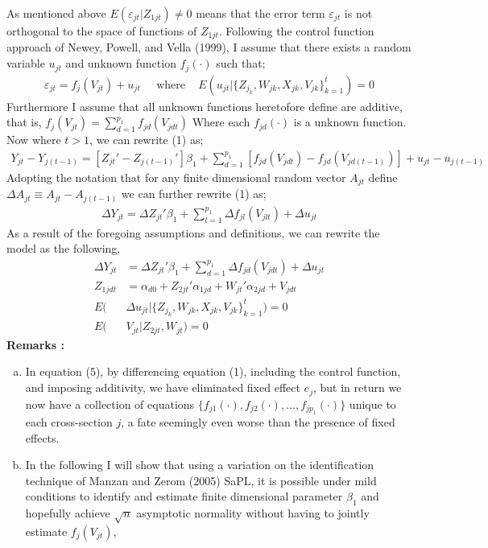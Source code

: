 \documentclass[10pt]{article}
\begin{document}
 \noindent
As mentioned above $E(\varepsilon_{jt} | Z_{1jt} ) \neq 0$ means that the error term $\varepsilon_{jt}$ is not orthogonal to the space of functions of $Z_{1jt}$. Following the control function approach of Newey, Powell, and Vella (1999), I assume that there exists a random variable $u_{jt}$ and unknown function $f_j(\cdot)$ such that;
 \begin{align*}
 \varepsilon_{jt} = f_j(V_{jt}) + u_{jt}  \;\;\;\ \text{ where } \;\;\; E(u_{jt} | \{Z_{j_k},W_{jk},X_{jk},V_{jk} \}_{k=1}^t) = 0
 \end{align*}
 Furthermore I assume that all unknown functions heretofore define are additive, that is, $f_j(V_{jt}) = \sum_{d=1}^{p_1} f_{jd}(V_{jdt})$
%
Where each $f_{jd}(\cdot)$ is a unknown function.
Now where $t>1$, we can rewrite (1) as;
\begin{align*}
Y_{jt} - Y_{j(t-1)} = [ Z_{jt}' - Z_{j(t-1)}' ]\beta_1 +  \sum_{d=1}^{p_1} [ f_{jd}(V_{jdt}) - f_{jd}(V_{jd(t-1)})] + u_{jt} - u_{j(t-1)}
\end{align*}
Adopting the notation that for any finite dimensional random vector $A_{jt}$ define $\Delta A_{jt}  \equiv A_{jt} - A_{j(t-1)}$ we can further rewrite (1) as;
\begin{align*}
\Delta Y_{jt} = \Delta Z_{jt}'\beta_1  + \sum_{l=1}^{p_1} \Delta f_{jl}(V_{jlt}) + \Delta u_{jt}
\end{align*}
As a result of the foregoing assumptions and definitions, we can rewrite the model as the following,
\begin{align}
\Delta Y_{jt} &= \Delta Z_{jt}'\beta_1 + \sum_{d=1}^{p_1} \Delta f_{jd}(V_{jdt}) + \Delta u_{jt} \\
%
Z_{1jdt} &= \alpha_{d0} + Z_{2jt}' \alpha_{1jd} + W_{jt}' \alpha_{2jd} + V_{jdt} \tag{2d}\\
%
E(&\Delta u_{jt} | \{Z_{j_k},W_{jk},X_{jk},V_{jk} \}_{k=1}^t) = 0 \\
%
E(& V_{jt} | Z_{2jt},W_{jt}) = 0
%
\end{align}
%
\noindent \bf Remarks \rm:
\begin{enumerate}[a.)]
    \item In equation (5), by differencing equation (1), including the control function, and imposing additivity, we have eliminated fixed effect $e_j$, but in return we now have a collection of equations $\{f_{j1}(\cdot),f_{j2}(\cdot), \ldots , f_{jp_1}(\cdot)\}$ unique to each cross-section $j$, a fate seemingly even worse than the presence of fixed effects.
    \item In the following I will show that using a variation on the identification technique of Manzan and Zerom (2005) SaPL, it is possible under mild conditions to identify and estimate finite dimensional parameter $\beta_1$  and hopefully achieve $\sqrt{n}$ asymptotic normality  without having to jointly estimate $f_j(V_{jt})$,
\end{enumerate}
\end{document}
